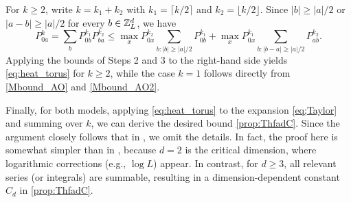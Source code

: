 \smallskip
{} For $k\ge 2$, write $k=k_1+k_2$ with $k_1=\lceil k/2\rceil$ and $k_2=\lfloor k/2\rfloor$. Since $|b|\ge |a|/2$ or $|a-b|\ge |a|/2$ for every $b\in{\mathbb Z}_L^d$, we have
\[P^k_{0a}=\sum_b P^{k_1}_{0b}P^{k_2}_{ba}\le \max_{x}P^{k_2}_{0x}\sum_{b:|b|\ge |a|/2}P^{k_1}_{0b}+\max_xP^{k_1}_{0x}\sum_{b:|b-a|\ge|a|/2}P^{k_2}_{ab}.\]
Applying the bounds of Steps 2 and 3 to the right-hand side yields \eqref{eq:heat_torus} for $k\ge 2$, while the case $k=1$ follows directly from \eqref{Mbound_AO} and \eqref{Mbound_AO2}. 

\smallskip
Finally, for both models, applying \eqref{eq:heat_torus} to the expansion \eqref{eq;Taylor} and summing over $k$, we can derive the desired bound \eqref{prop:ThfadC}.
Since the argument closely follows that in \cite[Section 8]{DYYY25}, we omit the details. In fact, the proof here is somewhat simpler than in \cite{DYYY25}, because $d=2$ is the critical dimension, where logarithmic corrections (e.g., $\log L$) appear. In contrast, for $d\ge 3$, all relevant series (or integrals) are summable, resulting in a dimension-dependent constant $C_d$ in \eqref{prop:ThfadC}.







